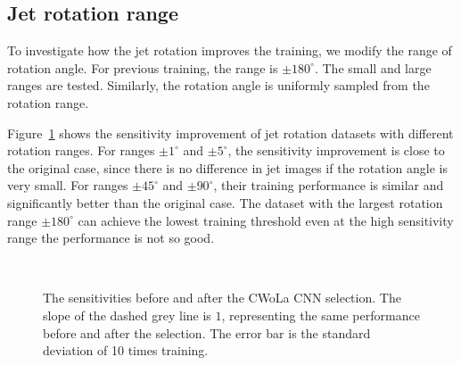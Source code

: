 \documentclass[12pt]{article}
\begin{document}
	\subsection{Jet rotation range}%
	\label{sub:jet_rotation_range}
		To investigate how the jet rotation improves the training, we modify the range of rotation angle. For previous training, the range is $\pm 180^\circ$. The small and large ranges are tested. Similarly, the rotation angle is uniformly sampled from the rotation range.

		Figure~\ref{fig:sensitivity_improvement_origin_jet_aug_5_range_1_5_45_90_180} shows the sensitivity improvement of jet rotation datasets with different rotation ranges. For ranges $\pm 1^\circ$ and $\pm 5^\circ$, the sensitivity improvement is close to the original case, since there is no difference in jet images if the rotation angle is very small. For ranges $\pm 45^\circ$ and  $\pm 90^\circ$, their training performance is similar and significantly better than the original case. The dataset with the largest rotation range $\pm 180^\circ$ can achieve the lowest training threshold even at the high sensitivity range the performance is not so good.
		\begin{figure}[htpb]
			\centering
			 \\
			\caption{The sensitivities before and after the CWoLa CNN selection. The slope of the dashed grey line is $1$, representing the same performance before and after the selection. The error bar is the standard deviation of 10 times training.}
			\label{fig:sensitivity_improvement_origin_jet_aug_5_range_1_5_45_90_180}
		\end{figure}



		
\end{document}
